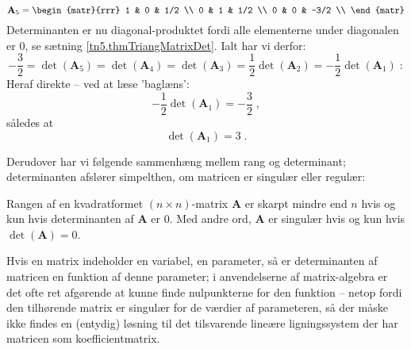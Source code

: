 \begin{example}
\begin{equation}
\mathbf{A}_{5} =  \begin{matr}{rrr}
             1 & 0 & 1/2 \\
             0 & 1 & 1/2 \\
             0 & 0 & -3/2 \\
           \end{matr}
\end{equation}
Determinanten er nu diagonal-produktet fordi alle elementerne under diagonalen er $0$, se sætning \ref{tn5.thmTriangMatrixDet}. Ialt har vi derfor:
\begin{equation}
-\frac{3}{2} =    \det(\mathbf{A}_{5}) =  \det(\mathbf{A}_{4}) =   \det(\mathbf{A}_{3}) = \frac{1}{2}\det(\mathbf{A}_{2}) = -\frac{1}{2}\det(\mathbf{A}_{1}) \;:
\end{equation}
Heraf direkte -- ved at læse 'baglæns':
\begin{equation}
-\frac{1}{2}\det(\mathbf{A}_{1}) = -\frac{3}{2} \;,
\end{equation}
således at
\begin{equation}
\det(\mathbf{A}_{1}) = 3 \;.
\end{equation}
\end{example}

Derudover har vi følgende sammenhæng mellem rang og determinant; determinanten afslører simpelthen, om matricen er singulær eller regulær:

\begin{theorem}
Rangen af en kvadratformet $(n \times n)$-matrix $\mathbf{A}$ er skarpt mindre end $n$ hvis og kun hvis determinanten af $\mathbf{A}$ er $0$. Med andre ord, $\mathbf{A}$ er singulær hvis og kun hvis $\det(\mathbf{A}) = 0$.
\end{theorem}

Hvis en matrix indeholder en variabel, en parameter, så er determinanten af matricen en funktion af denne
parameter; i anvendelserne af matrix-algebra er det ofte ret afgørende at kunne finde nulpunkterne for den
funktion -- netop fordi den tilhørende matrix er singulær for de værdier af parameteren, så der måske ikke findes en (entydig) løsning til
det tilsvarende lineære ligningssystem der har matricen som koefficientmatrix.

